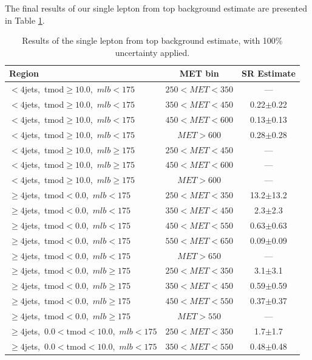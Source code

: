 The final results of our single lepton from top background estimate
are presented in Table \ref{tab:stop:1ltop:results}.

\begin{table}[htbp]
\centering
\caption{Results of the single lepton from top background estimate,
  with 100\% uncertainty applied.}
\label{tab:stop:1ltop:results}
\begin{tabular}{|l|c|c|}
\hline
Region & MET bin & SR Estimate\\
\hline
$<4$jets,~tmod$\ge10.0$,~$mlb<175$ & $250<MET<350$ &  ---  \\
$<4$jets,~tmod$\ge10.0$,~$mlb<175$ & $350<MET<450$ &  0.22$\pm$0.22 \\
$<4$jets,~tmod$\ge10.0$,~$mlb<175$ & $450<MET<600$ &  0.13$\pm$0.13  \\
$<4$jets,~tmod$\ge10.0$,~$mlb<175$ & $MET>600$     &  0.28$\pm$0.28 \\
\hline
$<4$jets,~tmod$\ge10.0$,~$mlb\ge175$ & $250<MET<450$ &  --- \\
$<4$jets,~tmod$\ge10.0$,~$mlb\ge175$ & $450<MET<600$ &  ---  \\
$<4$jets,~tmod$\ge10.0$,~$mlb\ge175$ & $MET>600$     &  ---  \\
\hline
$\ge4$jets,~tmod$<0.0$,~$mlb<175$ & $250<MET<350$ &  13.2$\pm$13.2  \\
$\ge4$jets,~tmod$<0.0$,~$mlb<175$ & $350<MET<450$ &  2.3$\pm$2.3  \\
$\ge4$jets,~tmod$<0.0$,~$mlb<175$ & $450<MET<550$ &  0.63$\pm$0.63  \\
$\ge4$jets,~tmod$<0.0$,~$mlb<175$ & $550<MET<650$ &  0.09$\pm$0.09 \\
$\ge4$jets,~tmod$<0.0$,~$mlb<175$ & $MET>650$     &  --- \\
\hline
$\ge4$jets,~tmod$<0.0$,~$mlb\ge175$ & $250<MET<350$ &  3.1$\pm$3.1  \\
$\ge4$jets,~tmod$<0.0$,~$mlb\ge175$ & $350<MET<450$ &  0.59$\pm$0.59  \\
$\ge4$jets,~tmod$<0.0$,~$mlb\ge175$ & $450<MET<550$ &  0.37$\pm$0.37  \\
$\ge4$jets,~tmod$<0.0$,~$mlb\ge175$ & $MET>550$     &  ---  \\
\hline
$\ge4$jets,~$0.0<$tmod$<10.0$,~$mlb<175$ & $250<MET<350$ &  1.7$\pm$1.7  \\
$\ge4$jets,~$0.0<$tmod$<10.0$,~$mlb<175$ & $350<MET<550$ &  0.48$\pm$0.48  \\

\end{tabular}
\end{table}
